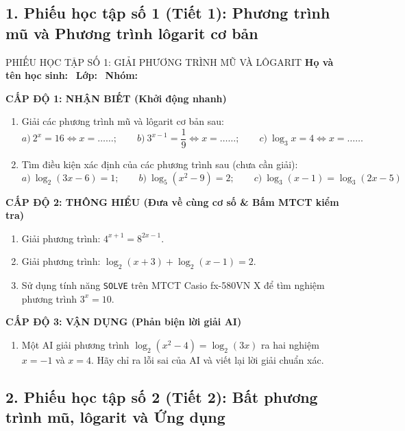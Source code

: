 \documentclass[12pt, a4paper]{article}
\begin{document}
\subsection*{1. Phiếu học tập số 1 (Tiết 1): Phương trình mũ và Phương trình lôgarit cơ bản}

\begin{pedabox}{PHIẾU HỌC TẬP SỐ 1: GIẢI PHƯƠNG TRÌNH MŨ VÀ LÔGARIT}
\textbf{Họ và tên học sinh:} \dotfill \ \textbf{Lớp:} \dotfill \ \textbf{Nhóm:} \dotfill

\noindent \textbf{CẤP ĐỘ 1: NHẬN BIẾT (Khởi động nhanh)}
\begin{enumerate}[leftmargin=0.6cm]
    \item Giải các phương trình mũ và lôgarit cơ bản sau:
    $$a) \ 2^x = 16 \iff x = \dots\dots; \qquad b) \ 3^{x-1} = \dfrac{1}{9} \iff x = \dots\dots; \qquad c) \ \log_3 x = 4 \iff x = \dots\dots$$
    \item Tìm điều kiện xác định của các phương trình sau (chưa cần giải):
    $$a) \ \log_2 (3x - 6) = 1; \qquad b) \ \log_5 (x^2 - 9) = 2; \qquad c) \ \log_3 (x - 1) = \log_3 (2x - 5)$$
\end{enumerate}

\noindent \textbf{CẤP ĐỘ 2: THÔNG HIỂU (Đưa về cùng cơ số \& Bấm MTCT kiểm tra)}
\begin{enumerate}[leftmargin=0.6cm]
    \item Giải phương trình: $4^{x+1} = 8^{2x - 1}$.
    \item Giải phương trình: $\log_2 (x + 3) + \log_2 (x - 1) = 2$.
    \item Sử dụng tính năng \texttt{SOLVE} trên MTCT Casio fx-580VN X để tìm nghiệm phương trình $3^{x} = 10$.
\end{enumerate}

\noindent \textbf{CẤP ĐỘ 3: VẬN DỤNG (Phản biện lời giải AI)}
\begin{enumerate}[leftmargin=0.6cm]
    \item Một AI giải phương trình $\log_2(x^2 - 4) = \log_2(3x)$ ra hai nghiệm $x = -1$ và $x = 4$. Hãy chỉ ra lỗi sai của AI và viết lại lời giải chuẩn xác.
\end{enumerate}
\end{pedabox}

\subsection*{2. Phiếu học tập số 2 (Tiết 2): Bất phương trình mũ, lôgarit và Ứng dụng}
\end{document}

